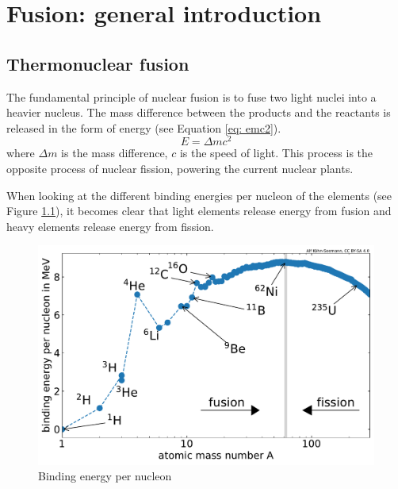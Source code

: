 \setchapterpreamble[u]{\margintoc}
\chapter{Fusion: general introduction}\label{Chapter1}


\section{Thermonuclear fusion}

The fundamental principle of nuclear fusion is to fuse two light nuclei into a heavier nucleus.
The mass difference between the products and the reactants is released in the form of energy (see Equation \ref{eq: emc2}).
\begin{equation}
    E = \Delta m c^2
    \label{eq: emc2}
\end{equation}
where $\Delta m$ is the mass difference, $c$ is the speed of light.
This process is the opposite process of nuclear fission, powering the current nuclear plants.

When looking at the different binding energies per nucleon of the elements (see Figure \ref{fig: binding energy per nucleon}), it becomes clear that light elements release energy from fusion and heavy elements release energy from fission.

\begin{figure} [h]
    \centering
    \includegraphics[width=\linewidth]{Figures/Chapter1/binding_energy_per_nucleon.pdf}
    \caption{Binding energy per nucleon \cite{kohn-seemann_alfkoehnfusion_plots_2021}}
    \label{fig: binding energy per nucleon}
\end{figure}

